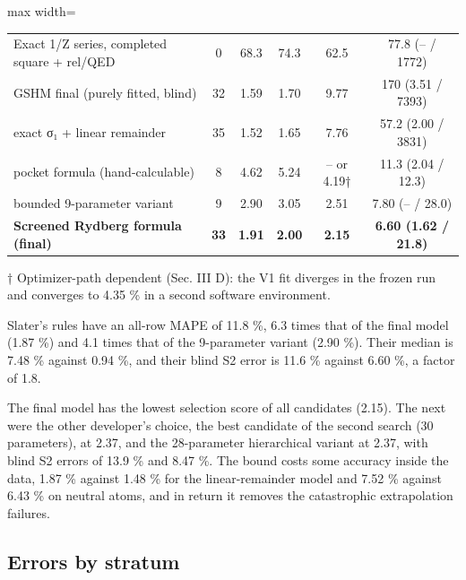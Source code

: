 \documentclass[aps,pra,preprint,notitlepage,superscriptaddress,amsmath,amssymb]{revtex4-2}
\begin{document}
\begin{table}[htbp]
\begin{adjustbox}{max width=\linewidth}
\begin{tabular}{lccccc}
Exact 1/Z series, completed square + rel/QED & 0 & 68.3 & 74.3 & 62.5 & 77.8 (– / 1772) \\
GSHM final (purely fitted, blind) & 32 & 1.59 & 1.70 & 9.77 & 170 (3.51 / 7393) \\
exact σ₁ + linear remainder & 35 & 1.52 & 1.65 & 7.76 & 57.2 (2.00 / 3831) \\
pocket formula (hand-calculable) & 8 & 4.62 & 5.24 & – or 4.19† & 11.3 (2.04 / 12.3) \\
bounded 9-parameter variant & 9 & 2.90 & 3.05 & 2.51 & 7.80 (– / 28.0) \\
\textbf{Screened Rydberg formula (final)} & \textbf{33} & \textbf{1.91} & \textbf{2.00} & \textbf{2.15} & \textbf{6.60 (1.62 / 21.8)} \\
\hline\hline
\end{tabular}
\end{adjustbox}
\end{table}


† Optimizer-path dependent (Sec. III D): the V1 fit diverges in the frozen run and converges to 4.35 \% in a second software environment.


Slater's rules have an all-row MAPE of 11.8 \%, 6.3 times that of the final model (1.87 \%) and 4.1 times that of the 9-parameter variant (2.90 \%). Their median is 7.48 \% against 0.94 \%, and their blind S2 error is 11.6 \% against 6.60 \%, a factor of 1.8.


The final model has the lowest selection score of all candidates (2.15). The next were the other developer's choice, the best candidate of the second search (30 parameters), at 2.37, and the 28-parameter hierarchical variant at 2.37, with blind S2 errors of 13.9 \% and 8.47 \%. The bound costs some accuracy inside the data, 1.87 \% against 1.48 \% for the linear-remainder model and 7.52 \% against 6.43 \% on neutral atoms, and in return it removes the catastrophic extrapolation failures.


\subsection{Errors by stratum}
\end{document}
